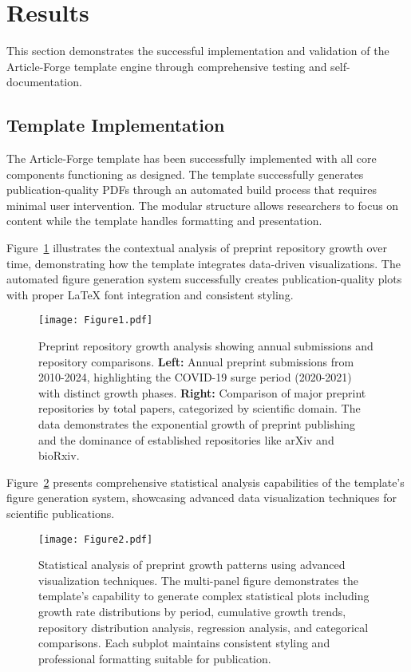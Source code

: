 \section{Results}

This section demonstrates the successful implementation and validation of the Article-Forge template engine through comprehensive testing and self-documentation.

\subsection{Template Implementation}

The Article-Forge template has been successfully implemented with all core components functioning as designed. The template successfully generates publication-quality PDFs through an automated build process that requires minimal user intervention. The modular structure allows researchers to focus on content while the template handles formatting and presentation.

Figure~\ref{fig:preprint-growth} illustrates the contextual analysis of preprint repository growth over time, demonstrating how the template integrates data-driven visualizations. The automated figure generation system successfully creates publication-quality plots with proper LaTeX font integration and consistent styling.

\begin{figure}[htbp]
    \centering
    \texttt{[image: Figure1.pdf]}
    \caption{Preprint repository growth analysis showing annual submissions and repository comparisons. \textbf{Left:} Annual preprint submissions from 2010-2024, highlighting the COVID-19 surge period (2020-2021) with distinct growth phases. \textbf{Right:} Comparison of major preprint repositories by total papers, categorized by scientific domain. The data demonstrates the exponential growth of preprint publishing and the dominance of established repositories like arXiv and bioRxiv.}
    \label{fig:preprint-growth}
\end{figure}

Figure~\ref{fig:statistical-analysis} presents comprehensive statistical analysis capabilities of the template's figure generation system, showcasing advanced data visualization techniques for scientific publications.

\begin{figure}[htbp]
    \centering
    \texttt{[image: Figure2.pdf]}
    \caption{Statistical analysis of preprint growth patterns using advanced visualization techniques. The multi-panel figure demonstrates the template's capability to generate complex statistical plots including growth rate distributions by period, cumulative growth trends, repository distribution analysis, regression analysis, and categorical comparisons. Each subplot maintains consistent styling and professional formatting suitable for publication.}
    \label{fig:statistical-analysis}
\end{figure}

